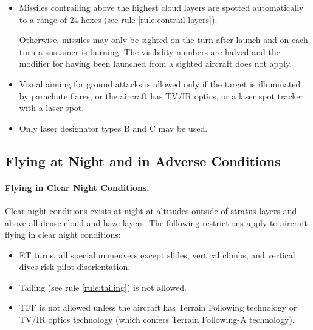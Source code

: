\begin{advancedrules}
{\begin{itemize}
    \item{} Missiles contrailing above the highest cloud layers are spotted automatically to a range of 24 hexes (see rule \ref{rule:contrail-layers}). 
    
    Otherwise, missiles may only be sighted on the turn after launch and on each turn a sustainer is burning. The visibility numbers are halved and the modifier for having been launched from a sighted aircraft does not apply.

    \item{} Visual aiming for ground attacks is allowed only if the target is illuminated by parachute flares, or the aircraft has TV/IR optics, or a laser spot tracker with a laser spot.

    \item{} Only laser designator types B and C may be used.

\end{itemize}

\subsection{Flying at Night and in Adverse Conditions}

\paragraph{Flying in Clear Night Conditions.}

Clear night conditions exists at night at altitudes outside of stratus layers and above all dense cloud and haze layers. The following restrictions apply to aircraft flying in clear night conditions:

\begin{itemize}

    \item{} ET turns, all special maneuvers except slides, vertical climbs, and vertical dives risk pilot disorientation.

    \item{} Tailing (see rule \ref{rule:tailing}) is not allowed.
    
    \item{} TFF is not allowed unless the aircraft has Terrain Following technology or TV/IR optics technology (which confers Terrain Following-A technology).


\end{itemize}}
\end{advancedrules}
